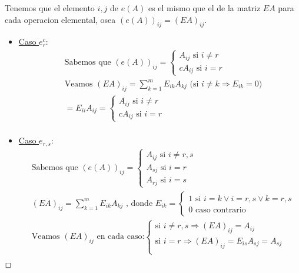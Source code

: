 \documentclass[]{article}
\newenvironment{proof}{\noindent{\bf Prueba:}}{$\hfill \Box$ \vspace{10pt}}
\begin{document}
\begin{proof}
    Tenemos que el elemento $i,j$ de $e(A)$ es el mismo que el de la matriz $EA$ para cada
    operacion elemental, osea $(e(A))_{ij}=(EA)_{ij}$.
    \begin{itemize}
        \item \underline{Caso $e_r^c$}:
        \begin{align*}
            &\text{Sabemos que } (e(A))_{ij}=
            \begin{cases}
                A_{ij} \text{ si } i \neq r\\
                cA_{ij} \text{ si } i = r
            \end{cases}\\
            &\text{Veamos }(EA)_{ij}=\sum_{k=1}^{m}E_{ik}A_{kj}
            \text{ (si $i \neq k \Longrightarrow E_{ik}=0$)}\\
            &= E_{ii}A_{ij}=
            \begin{cases}
                A_{ij} \text{ si } i \neq r\\
                cA_{ij} \text{ si } i = r
            \end{cases}\\
        \end{align*}
        \item \underline{Caso $e_{r,s}$}:
        \begin{align*}
            &\text{Sabemos que }(e(A))_{ij}=
            \begin{cases}
                A_{ij} \text{ si } i \neq r,s\\
                A_{sj} \text{ si } i = r\\
                A_{rj} \text{ si } i = s
            \end{cases}\\
            &(EA)_{ij}=\sum_{k=1}^{m} E_{ik}A_{kj}
            \text{ , donde } E_{ik}=
            \begin{cases}
                1 \text{ si } i=k \vee i=r,s \vee k=r,s\\
                0 \text{ caso contrario}
            \end{cases}\\
            &\text{Veamos $(EA)_{ij}$ en cada caso:}
            \begin{cases}
                \text{si } i \neq r,s \Longrightarrow (EA)_{ij} = A_{ij}\\
                \text{si } i=r \Longrightarrow (EA)_{ij} = E_{is}A_{sj} = A_{sj}\\

\end{cases}
\end{align*}
\end{itemize}
\end{proof}
\end{document}
